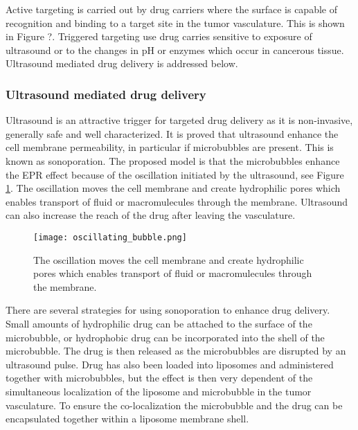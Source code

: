 Active targeting is carried out by drug carriers where the surface is capable of recognition and binding to a target site in the tumor vasculature. This is shown in Figure ?. Triggered targeting use drug carries sensitive to exposure of ultrasound or to the changes in pH or enzymes which occur in cancerous tissue. Ultrasound mediated drug delivery is addressed below.

\subsubsection{Ultrasound mediated drug delivery}
\label{sec:umdd}
Ultrasound is an attractive trigger for targeted drug delivery as it is non-invasive, generally safe and well characterized. It is proved that ultrasound enhance the cell membrane permeability, in particular if microbubbles are present\cite{VanWamel2006a}. This is known as sonoporation. The proposed model is that the microbubbles enhance the EPR effect because of the oscillation initiated by the ultrasound, see Figure \ref{Fig:oscillating_bubble}. The oscillation moves the cell membrane and create hydrophilic pores which enables transport of fluid or macromulecules through the membrane\cite{VanWamel2006a}. Ultrasound can also increase the reach of the drug after leaving the vasculature\cite{Eggen2013}.

\begin{figure}[h]
  \centering
  \label{Fig:oscillating_bubble}
  \texttt{[image: oscillating\_bubble.png]}
  \caption{The oscillation moves the cell membrane and create hydrophilic pores which enables transport of fluid or macromulecules through the membrane\cite{VanWamel2006a}.}
\end{figure}


There are several strategies for using sonoporation to enhance drug delivery. Small amounts of hydrophilic drug can be attached to the surface of the microbubble, or hydrophobic drug can be incorporated into the shell of the microbubble. The drug is then released as the microbubbles are disrupted by an ultrasound pulse\cite{Liu2006}. Drug has also been loaded into liposomes and administered together with microbubbles, but the effect is then very dependent of the simultaneous localization of the liposome and microbubble in the tumor vasculature. To ensure the co-localization the microbubble and the drug can be encapsulated together within a liposome membrane shell\cite{Ibsen2011}.


